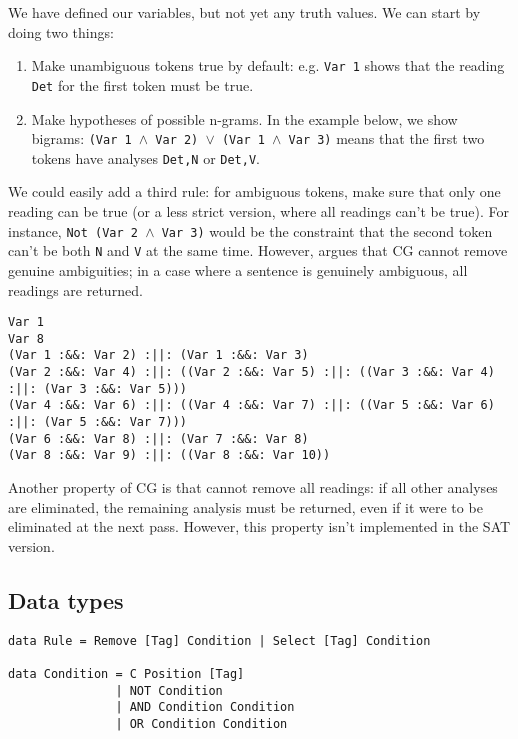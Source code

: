 \documentclass[a4paper, 11pt]{article}
\begin{document}
We have defined our variables, but not yet any truth values. We can
start by doing two things:
\begin{enumerate}
\item Make unambiguous tokens true by default: e.g. \texttt{Var 1}
  shows that the reading \texttt{Det} for the first token must be true.
\item Make hypotheses of possible n-grams. In the example below, we
show bigrams: \texttt{(Var 1 $\wedge$ Var 2) $\vee$ (Var 1 $\wedge$ Var 3)}
means that the first two tokens have analyses \texttt{Det,N} or
\texttt{Det,V}.
\end{enumerate}

We could easily add a third rule: for ambiguous tokens, make sure that
only one reading can be true (or a less strict version, where all
readings can't be true). For instance, \texttt{Not (Var 2 $\wedge$ Var
  3)} would be the constraint that the second token can't be both
\texttt{N} and \texttt{V} at the same time. However,
\cite{KarlssonTODO} argues that CG cannot remove genuine ambiguities;
in a case where a sentence is genuinely ambiguous, all readings are
returned.



\begin{lstlisting}
Var 1
Var 8
(Var 1 :&&: Var 2) :||: (Var 1 :&&: Var 3)
(Var 2 :&&: Var 4) :||: ((Var 2 :&&: Var 5) :||: ((Var 3 :&&: Var 4) :||: (Var 3 :&&: Var 5)))
(Var 4 :&&: Var 6) :||: ((Var 4 :&&: Var 7) :||: ((Var 5 :&&: Var 6) :||: (Var 5 :&&: Var 7)))
(Var 6 :&&: Var 8) :||: (Var 7 :&&: Var 8)
(Var 8 :&&: Var 9) :||: ((Var 8 :&&: Var 10))
\end{lstlisting}

Another property of CG is that cannot remove all readings: if all
other analyses are eliminated, the remaining analysis must be
returned, even if it were to be eliminated at the next pass. 
However, this property isn't implemented in the SAT version.

\subsection{Data types}

\begin{lstlisting}
data Rule = Remove [Tag] Condition | Select [Tag] Condition

data Condition = C Position [Tag]
               | NOT Condition
               | AND Condition Condition
               | OR Condition Condition 
\end{lstlisting}
\end{document}
